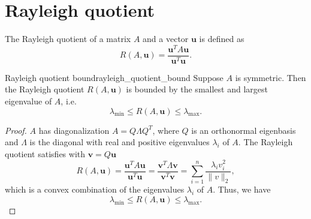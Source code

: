 \section{Rayleigh quotient} \label{sec:rayleigh_quotient}
\begin{APPfancydef}
  The Rayleigh quotient of a matrix $A$ and a vector $\mathbf{u}$ is defined as
  \begin{equation}
    R(A, \mathbf{u}) = \frac{\mathbf{u}^T A \mathbf{u}}{\mathbf{u}^T \mathbf{u}}.
    \label{eq:rayleigh_quotient}
  \end{equation}
\end{APPfancydef}
\begin{APPfancyth}{Rayleigh quotient bound}{rayleigh_quotient_bound}
  Suppose $A$ is symmetric. Then the Rayleigh quotient $R(A, \mathbf{u})$ is bounded by the smallest and largest eigenvalue of $A$, i.e.
  \[
    \lambda_{\min} \leq R(A, \mathbf{u}) \leq \lambda_{\max}.
  \]
\end{APPfancyth}
\begin{proof}
  $A$ has diagonalization $A = Q \Lambda Q^T$, where $Q$ is an orthonormal eigenbasis and $\Lambda$ is the diagonal with real and positive eigenvalues $\lambda_i$ of $A$. The Rayleigh quotient satisfies with $\mathbf{v} = Q \mathbf{u}$
  \[
    R(A, \mathbf{u}) = \frac{\mathbf{u}^T A \mathbf{u}}{\mathbf{u}^T \mathbf{u}} = \frac{\mathbf{v}^T \Lambda \mathbf{v}}{\mathbf{v}^T \mathbf{v}} = \sum_{i=1}^n \frac{\lambda_i v_i^2}{\|v\|_2},
  \]
  which is a convex combination of the eigenvalues $\lambda_i$ of $A$. Thus, we have
  \[
    \lambda_{\min} \leq R(A, \mathbf{u}) \leq \lambda_{\max}.
  \]
\end{proof}